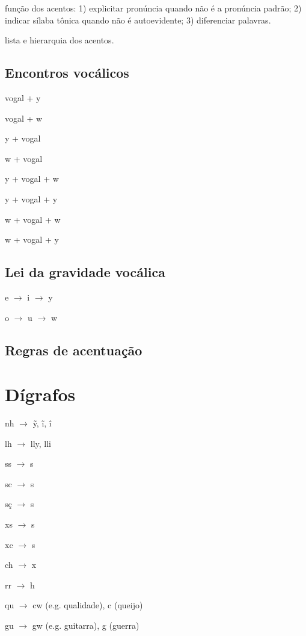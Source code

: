 \documentclass[12pt, a5paper, titlepage]{article}
\begin{document}
\begin{bilingualpages}
    \PtTableDiacritics
    
    função dos acentos: 1) explicitar pronúncia quando não é a pronúncia padrão; 2) indicar sílaba tônica quando não é autoevidente; 3) diferenciar palavras.

    lista e hierarquia dos acentos.

    \subsection{Encontros vocálicos}
    vogal + y
    
    vogal + w
    
    y + vogal
    
    w + vogal
    
    y + vogal + w
    
    y + vogal + y

    w + vogal + w
    
    w + vogal + y
    
    
    \subsection{Lei da gravidade vocálica}
    e $\rightarrow$ i $\rightarrow$ y

    o $\rightarrow$ u $\rightarrow$ w
    
    \subsection{Regras de acentuação}
    
    \section{Dígrafos}
    nh $\rightarrow$ \~y, ĩ, î
    
    lh $\rightarrow$ lly, lli
    
    ss $\rightarrow$ s
    
    sc $\rightarrow$ s
    
    sç $\rightarrow$ s
    
    xs $\rightarrow$ s
    
    xc $\rightarrow$ s
    
    ch $\rightarrow$ x
    
    rr $\rightarrow$ h

    qu $\rightarrow$ cw (e.g. qualidade), c (queijo)
    
    gu $\rightarrow$ gw (e.g. guitarra), g (guerra)


\end{bilingualpages}
\end{document}
